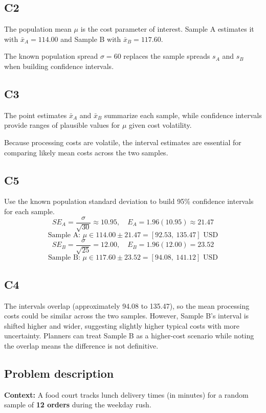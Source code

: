 \begin{ExamProblems}
		\subsection*{C2}
		The population mean $\mu$ is the cost parameter of interest. Sample A estimates it with $\bar{x}_A = 114.00$ and Sample B with $\bar{x}_B = 117.60$.
		
		The known population spread $\sigma = 60$ replaces the sample spreads $s_A$ and $s_B$ when building confidence intervals.
		
		\subsection*{C3}
		The point estimates $\bar{x}_A$ and $\bar{x}_B$ summarize each sample, while confidence intervals provide ranges of plausible values for $\mu$ given cost volatility.
		
		Because processing costs are volatile, the interval estimates are essential for comparing likely mean costs across the two samples.
		
		\subsection*{C5}
		Use the known population standard deviation to build 95\% confidence intervals for each sample.
		\[
		SE_A = \frac{\sigma}{\sqrt{30}} \approx 10.95, \quad E_A = 1.96(10.95) \approx 21.47
		\]
		\[
		\text{Sample A: } \mu \in 114.00 \pm 21.47 = [92.53,\ 135.47] \text{ USD}
		\]
		\[
		SE_B = \frac{\sigma}{\sqrt{25}} = 12.00, \quad E_B = 1.96(12.00) = 23.52
		\]
		\[
		\text{Sample B: } \mu \in 117.60 \pm 23.52 = [94.08,\ 141.12] \text{ USD}
		\]
		
		\subsection*{C4}
		The intervals overlap (approximately 94.08 to 135.47), so the mean processing costs could be similar across the two samples. However, Sample B’s interval is shifted higher and wider, suggesting slightly higher typical costs with more uncertainty. Planners can treat Sample B as a higher-cost scenario while noting the overlap means the difference is not definitive.

		
		\item
		\subsection*{Problem description}
		\textbf{Context:} A food court tracks lunch delivery times (in minutes) for a random sample of \textbf{12 orders} during the weekday rush.
		

\end{ExamProblems}
